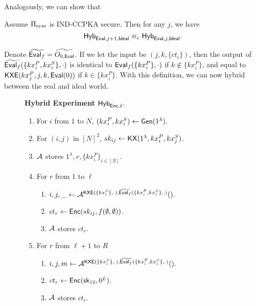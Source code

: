 Analogously, we can show that
\begin{lemma}
     Assume $\Pi_{\text{sym}}$ is IND-CCPKA secure. Then for any $j$, we have 
    $$\mathsf{Hyb}_{\mathsf{Eval}, j + 1, \mathsf{Ideal}} \equiv_c \mathsf{Hyb}_{\mathsf{Eval}, j, \mathsf{Ideal}}.$$
\end{lemma}
Denote $\widetilde{\mathsf{Eval}_f} = \widetilde{O_{0, \mathsf{Eval}}}$. If we let the input be $(j, k, \{ct_i\})$, then the output of $\widetilde{\mathsf{Eval}_f}(\{kx_i^P, kx_i^S\}, \cdot)$ is identical to $\mathsf{Eval}_f(\{kx_i^P\}, \cdot)$ if $k \notin \{kx_i^P\}$, and equal to $\mathsf{KXE}(kx_j^P, j, k, \mathsf{Eval}(0))$ if $k \in \{kx_i^P\}$. With this definition, we can now hybrid between the real and ideal world.

\begin{figure}[h!]
\begin{framed}
\textbf{Hybrid Experiment} $\mathsf{Hyb}_{\mathsf{Enc}, \ell}$.
\begin{enumerate}
    \item For $i$ from $1$ to $N$, $(kx_i^P, kx_i^S) \leftarrow \mathsf{Gen}(1^{\lambda}).$
    \item For $(i, j)$ in $[N]^2$, $sk_{ij} \leftarrow \mathsf{KX}(1^{\lambda}, kx_i^P, kx_j^S)$.
    \item $\mathcal{A}$ stores $1^{\lambda}, r, \{kx_i^P\}_{i \in [N]}$.
    \item For $r$ from $1$ to $\ell$
    \begin{enumerate}
        \item $i, j, \_ \leftarrow \mathcal{A}^{\mathsf{KXE}(\{kx_i^S\}, \cdot), \widetilde{\mathsf{Eval}_f}(\{kx_i^P, kx_i^S\}, \cdot)}().$
        \item $ct_r \leftarrow \mathsf{Enc}(sk_{ij}, f(\emptyset, \emptyset))$.
        \item $\mathcal{A}$ stores $ct_r$.
    \end{enumerate}
    \item For $r$ from $\ell + 1$ to $R$
    \begin{enumerate}
        \item $i, j, m \leftarrow \mathcal{A}^{\mathsf{KXE}(\{kx_i^S\}, \cdot), \widetilde{\mathsf{Eval}_f}(\{kx_i^P, kx_i^S\}, \cdot)}().$
        \item $ct_r \leftarrow \mathsf{Enc}({\mathsf{sk}}_{12}, 0^{L})$.
        \item $\mathcal{A}$ stores $ct_r$.
    \end{enumerate}
\end{enumerate}
\end{framed}
\end{figure}

